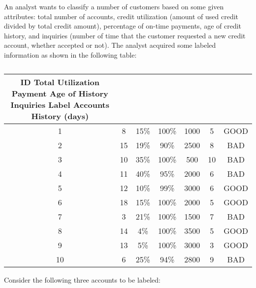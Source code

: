 \begin{problem}
An analyst wants to classify a number of customers based on some given attributes: total number of accounts, credit utilization (amount of used credit divided by total credit amount), percentage of on-time payments, age of credit history, and inquiries (number of time that the customer requested a new credit account, whether accepted or not). The analyst acquired some labeled information as shown in the following table:

\begin{table}[]
  \centering
  \caption{}\label{tab:}
  \begin{tabular}{|c||c|c|c|c|c|c|}
    ID Total Utilization Payment Age of History Inquiries Label
Accounts History (days) \\\hline\hline
1 & 8 & 15\% & 100\% & 1000 & 5 & GOOD \\\hline
2 & 15 & 19\% & 90\% & 2500 & 8 & BAD \\\hline
3 & 10 & 35\% & 100\% & 500 & 10 & BAD \\\hline
4 & 11 & 40\% & 95\% & 2000 & 6 & BAD \\\hline
5 & 12 & 10\% & 99\% & 3000 & 6 & GOOD \\\hline
6 & 18 & 15\% & 100\% & 2000 & 5 & GOOD \\\hline
7 & 3 & 21\% & 100\% & 1500 & 7 & BAD \\\hline
8 & 14 & 4\% & 100\% & 3500 & 5 & GOOD \\\hline
9 & 13 & 5\% & 100\% & 3000 & 3 & GOOD \\\hline
10 & 6 & 25\% & 94\% & 2800 & 9 & BAD \\\hline
  \end{tabular}
\end{table}


Consider the following three accounts to be labeled:



\end{problem}
